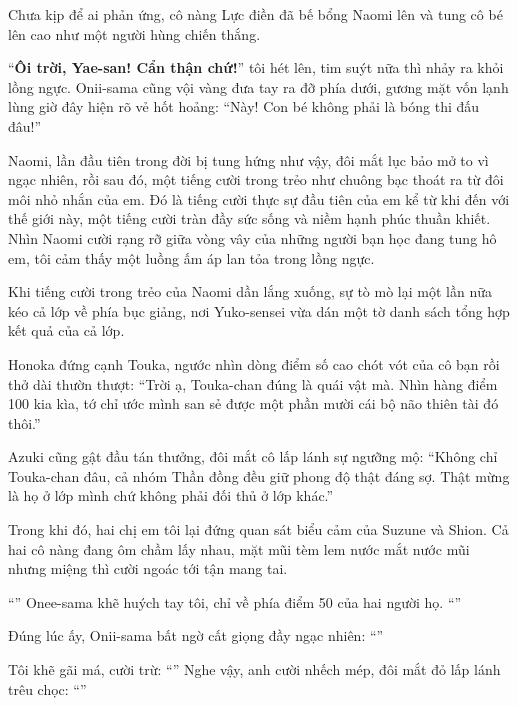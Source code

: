\documentclass[../main.tex]{subfiles}
\begin{document}
Chưa kịp để ai phản ứng, cô nàng Lực điền đã bế bổng Naomi lên và tung cô bé lên cao như một người hùng chiến thắng.

``\textbf{Ôi trời, Yae-san! Cẩn thận chứ!}'' tôi hét lên, tim suýt nữa thì nhảy ra khỏi lồng ngực. Onii-sama cũng vội vàng đưa tay ra đỡ phía dưới, gương mặt vốn lạnh lùng giờ đây hiện rõ vẻ hốt hoảng: ``Này! Con bé không phải là bóng thi đấu đâu!''

Naomi, lần đầu tiên trong đời bị tung hứng như vậy, đôi mắt lục bảo mở to vì ngạc nhiên, rồi sau đó, một tiếng cười trong trẻo như chuông bạc thoát ra từ đôi môi nhỏ nhắn của em. Đó là tiếng cười thực sự đầu tiên của em kể từ khi đến với thế giới này, một tiếng cười tràn đầy sức sống và niềm hạnh phúc thuần khiết. Nhìn Naomi cười rạng rỡ giữa vòng vây của những người bạn học đang tung hô em, tôi cảm thấy một luồng ấm áp lan tỏa trong lồng ngực.

Khi tiếng cười trong trẻo của Naomi dần lắng xuống, sự tò mò lại một lần nữa kéo cả lớp về phía bục giảng, nơi Yuko-sensei vừa dán một tờ danh sách tổng hợp kết quả của cả lớp.

Honoka đứng cạnh Touka, ngước nhìn dòng điểm số cao chót vót của cô bạn rồi thở dài thườn thượt: ``Trời ạ, Touka-chan đúng là quái vật mà. Nhìn hàng điểm 100 kia kìa, tớ chỉ ước mình san sẻ được một phần mười cái bộ não thiên tài đó thôi.''

Azuki cũng gật đầu tán thưởng, đôi mắt cô lấp lánh sự ngưỡng mộ: ``Không chỉ Touka-chan đâu, cả nhóm Thần đồng đều giữ phong độ thật đáng sợ. Thật mừng là họ ở lớp mình chứ không phải đối thủ ở lớp khác.''

Trong khi đó, hai chị em tôi lại đứng quan sát biểu cảm của Suzune và Shion. Cả hai cô nàng đang ôm chầm lấy nhau, mặt mũi tèm lem nước mắt nước mũi nhưng miệng thì cười ngoác tới tận mang tai.

``'' Onee-sama khẽ huých tay tôi, chỉ về phía điểm 50 của hai người họ. ``''

Đúng lúc ấy, Onii-sama bất ngờ cất giọng đầy ngạc nhiên: ``''

Tôi khẽ gãi má, cười trừ: ``'' Nghe vậy, anh cười nhếch mép, đôi mắt đỏ lấp lánh trêu chọc: ``''
\end{document}
